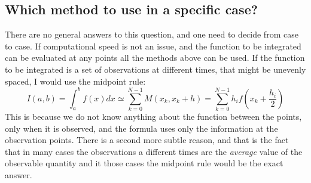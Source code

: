 \documentclass[graybox,sectrefs,envcountresetchap,open=right,final]{svmonodo}
\begin{document}
\subsection{Which method to use in a specific case?}
There are no general answers to this question, and one need to decide from case to case. If computational speed is not an issue, 
and the function to be integrated can be evaluated at any points all the methods above can be used. If the function to be integrated 
is a set of observations at different times, that might be unevenly spaced, I would use the midpoint rule:
\begin{equation}
I(a,b)=\int_a^bf(x)dx\simeq\sum_{k=0}^{N-1}M(x_k,x_k+h)=\sum_{k=0}^{N-1}h_if(x_k+\frac{h_i}{2})
\end{equation}
This is because we do not know anything about the function between the points, only when it is observed, and the formula uses only 
the information at the observation points. There is a second more subtle reason, and that is the fact that in many cases the 
observations a different times are the {\it average} value of the observable quantity and it those cases the midpoint 
rule would be the exact answer. 
\end{document}
